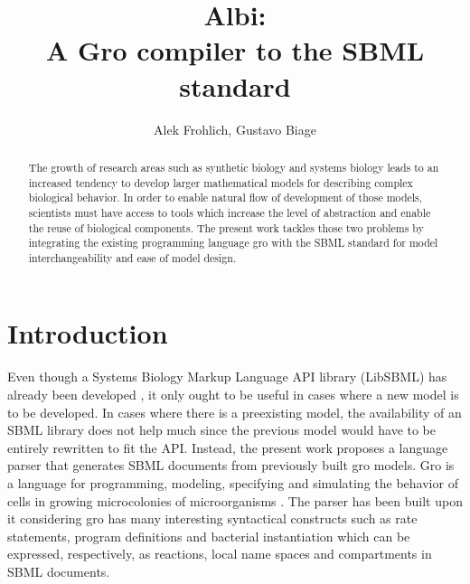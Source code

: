 \documentclass[12pt]{article}
\title{Albi:\\ A Gro compiler to the SBML standard}
\author{Alek Frohlich\inst{1}, Gustavo Biage\inst{1}}
\begin{document}
\maketitle

\begin{abstract}


    The growth of research areas such as synthetic biology and systems biology leads to an increased tendency to develop larger mathematical models for describing complex biological behavior. In order to enable natural flow of development of those models, scientists must have access to tools which increase the level of abstraction and enable the reuse of biological components. The present work tackles those two problems by integrating the existing programming language gro with the SBML standard for model interchangeability and ease of model design.


\end{abstract}

\section{Introduction}

    Even though a Systems Biology Markup Language API library (LibSBML) has already been developed \cite{Bornstein2008}, it only ought to be useful in cases where a new model is to be developed. In cases where there is a preexisting model, the availability of an SBML library does not help much since the previous model would have to be entirely rewritten to fit the API. Instead, the present work proposes a language parser that generates SBML documents from previously built gro models. Gro is a language for programming, modeling, specifying and simulating the behavior of cells in growing microcolonies of microorganisms \cite{Jang2012}. The parser has been built upon it considering gro has many interesting syntactical constructs such as rate statements, program definitions and bacterial instantiation which can be expressed, respectively, as reactions, local name spaces and compartments in SBML documents.
    
\end{document}
